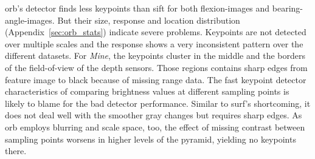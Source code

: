 \begin{table}[H]
    {\renewcommand{\arraystretch}{1.2}%
    \setlength{\tabcolsep}{0.3em}%
    \footnotesize

    }
    \caption[Keypoint and matching results for \texttt{\acrshort{orb}/raw/default}]{\emph{Keypoint and matching results for \texttt{\acrshort{orb}/raw/default}.} The high number of false negatives and the low Youden index are an indicator for problems of the algorithm. The amount of additional keypoints for \glspl{flexion-image} is lower than for \acrshort{sift}.}
\end{table}
\acrshort{orb}'s detector finds less keypoints than \acrshort{sift} for both \glspl{flexion-image} and \glspl{bearing-angle-image}.
But their size, response and location distribution (Appendix~\ref{sec:orb_stats}) indicate severe problems.
Keypoints are not detected over multiple scales and the response shows a very inconsistent pattern over the different datasets.
For \emph{Mine}, the keypoints cluster in the middle and the borders of the field-of-view of the depth sensors.
Those regions contains sharp edges from feature image to black because of missing range data.
The \acrshort{fast} keypoint detector characteristics of comparing brightness values at different sampling points is likely to blame for the bad detector performance.
Similar to \acrshort{surf}'s shortcoming, it does not deal well with the smoother gray changes but requires sharp edges.
As \acrshort{orb} employs blurring and scale space, too, the effect of missing contrast between sampling points worsens in higher levels of the pyramid, yielding no keypoints there.
